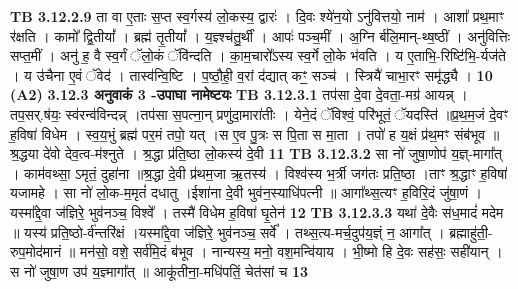 \documentclass[17pt]{extarticle}
\begin{document}
{{{{{{{{{{{{{{{{{{{{{{{                  \newline
                                \textbf{ TB 3.12.2.9} \newline
                  ता वा ए॒ताः स॒प्त स्व॒र्गस्य॑ लो॒कस्य॒ द्वारः॑ । दि॒वः श्ये॑न॒यो ऽनु॑वित्तयो॒ नाम॑ । आशा᳚ प्रथ॒माꣳ र॑क्षति । कामो᳚ द्वि॒तीयां᳚ । ब्रह्म॑ तृ॒तीयां᳚ । य॒ज्ञ्श्च॑तु॒र्थीं । आपः॑ पञ्च॒मीं । अ॒ग्नि र्ब॑लि॒मान्-थ्ष॒ष्ठीं । अनु॑वित्तिः सप्त॒मीं । अनु॑ ह॒ वै स्व॒र्गं ॅलो॒कं ॅवि॑न्दति । का॒म॒चारो᳚ऽस्य स्व॒र्गे लो॒के भ॑वति । य ए॒ताभि॒-रिष्टि॑भि॒-र्यज॑ते । य उ॑चैना ए॒वं ॅवेद॑ । तास्व॑न्वि॒ष्टि । प॒ष्ठौ॒ही॒ व॒रां द॑द्यात् कꣳ॒॒ सञ्च॑ । स्त्रियै॑ चाभा॒रꣳ समृ॑द्ध्यै । \textbf{ 10} \newline
                  \newline
                                     \textbf{(A2)} \newline \newline
                \textbf{ 3.12.3    अनुवाकं   3 -उपाघा नामेष्टयः} \newline
                                \textbf{ TB 3.12.3.1} \newline
                  तप॑सा दे॒वा दे॒वता॒-मग्र॑ आयन्न् । तप॒सर्.ष॑यः॒ स्व॑रन्व॑विन्दन्न् ।तप॑सा स॒पत्ना॒न् प्रणु॑दा॒मारा॑तीः । येने॒दं ॅविश्वं॒ परि॑भूतं॒ ॅयदस्ति॑ ॥प्र॒थ॒म॒जं दे॒वꣳ ह॒विषा॑ विधेम । स्व॒य॒भुं ब्रह्म॑ पर॒मं तपो॒ यत् ।स ए॒व पु॒त्रः स पि॒ता स मा॒ता । तपो॑ ह य॒क्षं प्र॑थ॒मꣳ संब॑भूव ॥श्र॒द्धया दे॑वो देव॒त्व-म॑श्नुते । श्र॒द्धा प्र॑ति॒ष्ठा लो॒कस्य॑ दे॒वी \textbf{ 11} \newline
                  \newline
                                \textbf{ TB 3.12.3.2} \newline
                  सा नो॑ जुषा॒णोप॑ य॒ज्ञ्-मागा᳚त् । काम॑वथ्सा॒ ऽमृतं॒ दुहा॑ना ॥श्र॒द्धा दे॒वी प्र॑थम॒जा ऋ॒तस्य॑ । विश्व॑स्य भ॒र्त्री जग॑तः प्रति॒ष्ठा ।ताꣳ श्र॒द्धाꣳ ह॒विषा॑ यजामहे । सा नो॑ लो॒क-म॒मृतं॑ दधातु ।ईशा॑ना दे॒वी भुव॑न॒स्याधि॑पत्नी ॥ आगा᳚थ्स॒त्यꣳ ह॒विरि॒दं जु॑षा॒णं ।यस्मा᳚द्दे॒वा ज॑ज्ञिरे॒ भुव॑नञ्च॒ विश्वे᳚ । तस्मै॑ विधेम ह॒विषा॑ घृ॒तेन॑ \textbf{ 12} \newline
                  \newline
                                \textbf{ TB 3.12.3.3} \newline
                  यथा॑ दे॒वैः स॑ध॒मादं॑ मदेम ॥ यस्य॑ प्रति॒ष्ठो-र्व॑न्तरि॑क्षं ।यस्मा᳚द्दे॒वा ज॑ज्ञिरे॒ भुव॑नञ्च॒ सर्वे᳚ । तथ्स॒त्य-मर्च॒दुप॑य॒ज्ञ्ं न॒ आगा᳚त् । ब्रह्माहु॑ती॒-रुप॒मोद॑मानं ॥ मन॑सो॒ वशे॒ सर्व॑मि॒दं ब॑भूव । नान्यस्य॒ मनो॒ वश॒मन्वि॑याय । भी॒ष्मो हि दे॒वः सह॑सः॒ सही॑यान् । स नो॑ जुषा॒ण उप॑ य॒ज्ञ्मागा᳚त् ॥ आकू॑तीना॒-मधि॑पतिं॒ चेत॑सां च \textbf{ 13} \newline
}}}}}}}}}}}}}}}}}}}}}}}
\end{document}
